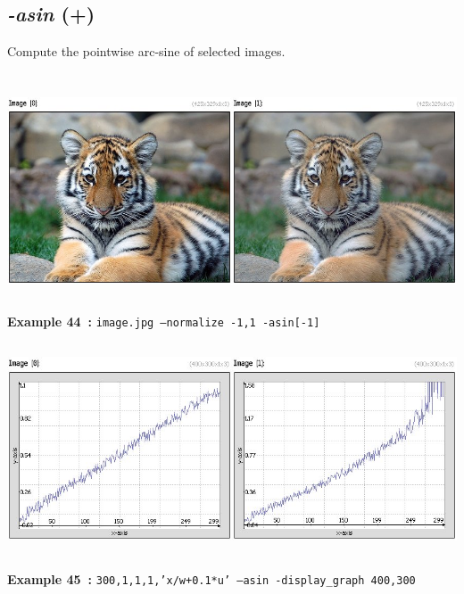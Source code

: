 \documentclass[a4paper,11pt,twoside]{book}
\begin{document}
\subsection{\emph{-asin} (+)}\vspace*{-0.5em}
Compute the pointwise arc-sine of selected images.
\begin{center}\includegraphics[keepaspectratio=true,height=7cm,width=\textwidth]{img/gmic_def44.jpg}\\
{\footnotesize \textbf{Example 44~:} \texttt{image.jpg --normalize -1,1 -asin[-1]}}
\\\includegraphics[keepaspectratio=true,height=7cm,width=\textwidth]{img/gmic_def45.jpg}\\
{\footnotesize \textbf{Example 45~:} \texttt{300,1,1,1,'x/w+0.1*u' --asin -display\_graph 400,300}}
\end{center}
\end{document}
